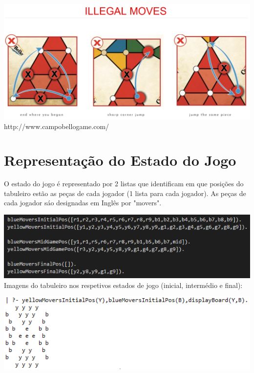 \documentclass[a4paper]{article}
\begin{document}
\includegraphics[scale=0.3]{illegalMoves.PNG}\linebreak\linebreak
http://www.campobellogame.com/


\section{Representação do Estado do Jogo}


O estado do jogo é representado por 2 listas que identificam em que posições do tabuleiro estão as peças de cada jogador (1 lista para cada jogador).
As peças de cada jogador sáo designadas em Inglês por "movers".\linebreak

\includegraphics[scale=0.7]{gameStates.PNG}\linebreak\linebreak
Imagens do tabuleiro nos respetivos estados de jogo (inicial, intermédio e final):\linebreak

\includegraphics[scale=1]{initialBoard.PNG}\linebreak\linebreak
\end{document}
